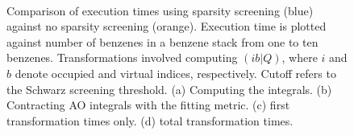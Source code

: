 \begin{figure}[H]
  \centering
  \hfill
  \hfill \\
  \hfill
  \caption{Comparison of execution times using sparsity screening (blue) against no sparsity screening (orange).  Execution time is plotted against number of benzenes
 in a benzene stack from one to ten benzenes. Transformations involved computing $(ib|Q)$, where $i$ and $b$ denote occupied and virtual indices, respectively.
 Cutoff refers to the Schwarz screening threshold. (a) Computing the integrals. (b) Contracting AO integrals with the fitting metric. 
(c) first transformation times only. (d) total transformation times.}
\end{figure}

